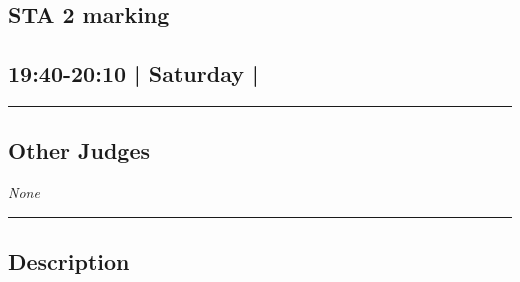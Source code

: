 \documentclass[10pt, A5]{article}
\begin{document}
		\begin{framed}
			\begin{minipage}{\textwidth}

			\setcounter{section}{72}
							\section{STA 2 marking}
						
			\subsection*{19:40-20:10 | Saturday | }

			\vspace{0.25cm}
			\hrule
			\vspace{0.25cm}


			\subsection*{Other Judges}
						\textit{None}

					\vspace{0.25cm}
			\hrule
			\vspace{0.25cm}

			\begin{minipage}{\textwidth}
			\subsection*{\faListAlt \: Description}
			
			\end{minipage}


	\end{minipage}
	\end{framed}

	
\end{document}
